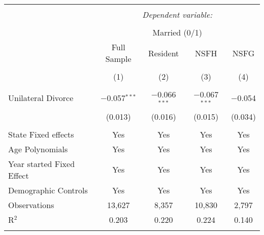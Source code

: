 
\begingroup 
\footnotesize 
\begin{tabular}{@{\extracolsep{5pt}}lcccc} 
\\[-1.8ex]\hline 
\hline \\[-1.8ex] 
 & \multicolumn{4}{c}{\textit{Dependent variable:}} \\ 
\cline{2-5} 
\\[-1.8ex] & \multicolumn{4}{c}{Married (0/1)} \\ 
 & Full Sample & Resident & NSFH & NSFG \\ 
\\[-1.8ex] & (1) & (2) & (3) & (4)\\ 
\hline \\[-1.8ex] 
 Unilateral Divorce & $-$0.057$^{***}$ & $-$0.066$^{***}$ & $-$0.067$^{***}$ & $-$0.054 \\ 
  & (0.013) & (0.016) & (0.015) & (0.034) \\ 
 \hline \\[-1.8ex] 
State Fixed effects & Yes & Yes & Yes & Yes \\ 
Age Polynomials & Yes & Yes & Yes & Yes \\ 
Year started Fixed Effect & Yes & Yes & Yes & Yes \\ 
Demographic Controls & Yes & Yes & Yes & Yes \\ 
Observations & 13,627 & 8,357 & 10,830 & 2,797 \\ 
R$^{2}$ & 0.203 & 0.220 & 0.224 & 0.140 \\ 
\hline 
\hline \\[-1.8ex] 
\end{tabular} 
\endgroup 
